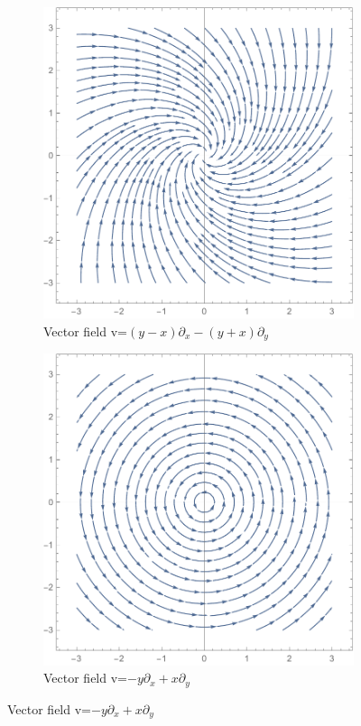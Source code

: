 \documentclass[a4paper,11pt,titlepage, article, oneside]{memoir}
\numberwithin{equation}{section}
\theoremstyle{definition}
\theoremstyle{remark}
\begin{document}
\begin{figure}[H]
\centering
\begin{subfigure}{.45\textwidth}
     \centering
     \includegraphics[width=\linewidth]{images/vfield_2.pdf}
     \caption{Vector field v=$(y-x)\partial_x-(y+x)\partial_y$} \label{Fig:vfield_2}
\end{subfigure}
\begin{subfigure}{.45\textwidth}
     \centering
     \includegraphics[width=\linewidth]{images/vfield_3.pdf}
     \caption{Vector field v=$-y\partial_x+x\partial_y$} \label{Fig:vfield_3}
\end{subfigure}
\end{figure}
\end{document}
